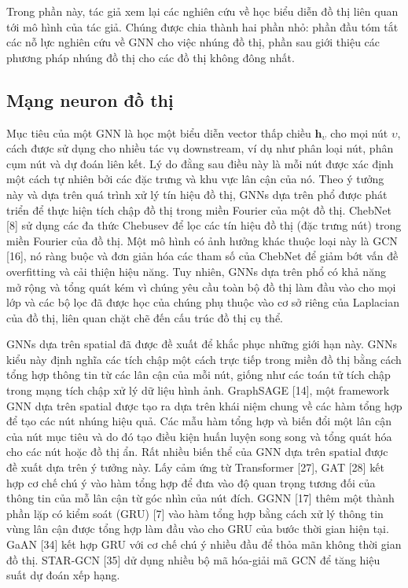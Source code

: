 Trong phần này, tác giả xem lại các nghiên cứu về học biểu diễn đồ thị liên quan tới mô hình của tác giả. Chúng được chia thành hai phần nhỏ: phần đầu tóm tắt các nỗ lực nghiên cứu về GNN cho việc nhúng đồ thị, phần sau giới thiệu các phương pháp nhúng đồ thị cho các đồ thị không đông nhất.

\subsection{Mạng neuron đồ thị}
Mục tiêu của một GNN là học một biểu diễn vector thấp chiều $\pmb{h}_{\upsilon}$ cho mọi nút $\upsilon$, cách được sử dụng cho nhiều tác vụ downstream, ví dụ như phân loại nút, phân cụm nút và dự đoán liên kết. Lý do đằng sau điều này là mỗi nút được xác định một cách tự nhiên bởi các đặc trưng và khu vực lân cận của nó. Theo ý tưởng này và dựa trên quá trình xử lý tín hiệu đồ thị, GNNs dựa trên phổ được phát triển để thực hiện tích chập đồ thị trong miền Fourier của một đồ thị. ChebNet [8] sử dụng các đa thức Chebusev để lọc các tín hiệu đồ thị (đặc trưng nút) trong miền Fourier của đồ thị. Một mô hình có ảnh hưởng khác thuộc loại này là GCN [16], nó ràng buộc và đơn giản hóa các tham số của ChebNet để giảm bớt vấn đề overfitting và cải thiện hiệu năng. Tuy nhiên, GNNs dựa trên phổ có khả năng mở rộng và tổng quát kém vì chúng yêu cầu toàn bộ đồ thị làm đầu vào cho mọi lớp và các bộ lọc đã được học của chúng phụ thuộc vào cơ sở riêng của Laplacian của đồ thị, liên quan chặt chẽ đến cấu trúc đồ thị cụ thể.

GNNs dựa trên spatial đã được đề xuất để khắc phục những giới hạn này. GNNs kiểu này định nghĩa các tích chập một cách trực tiếp trong miền đồ thị bằng cách tổng hợp thông tin từ các lân cận của mỗi nút, giống như các toán tử tích chập trong mạng tích chập xử lý dữ liệu hình ảnh. GraphSAGE [14], một framework GNN dựa trên spatial được tạo ra dựa trên khái niệm chung về các hàm tổng hợp để tạo các nút nhúng hiệu quả. Các mẫu hàm tổng hợp và biến đổi một lân cận của nút mục tiêu và do đó tạo điều kiện huấn luyện song song và tổng quát hóa cho các nút hoặc đồ thị ẩn. Rất nhiều biến thể của GNN dựa trên spatial được đề xuất dựa trên ý tưởng này. Lấy cảm ứng từ Transformer [27], GAT [28] kết hợp cơ chế chú ý vào hàm tổng hợp để đưa vào độ quan trọng tương đối của thông tin của mỗ lân cận từ góc nhìn của nút đích. GGNN [17] thêm một thành phần lặp có kiểm soát (GRU) [7] vào hàm tổng hợp bằng cách xử lý thông tin vùng lân cận được tổng hợp làm đầu vào cho GRU của bước thời gian hiện tại. GaAN [34] kết hợp GRU với cơ chế chú ý nhiều đầu để  thỏa mãn không thời gian đồ thị. STAR-GCN [35] dử dụng nhiều bộ mã hóa-giải mã GCN để
tăng hiệu suất dự đoán xếp hạng. 

